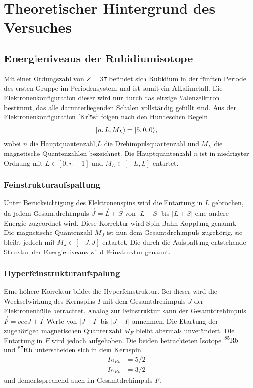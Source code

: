 \section{Theoretischer Hintergrund des Versuches}
\label{sec:Theorie}
\subsection{Energieniveaus der Rubidiumisotope}
Mit einer Ordungszahl von $Z=\num{37}$ befindet sich Rubidium in der 
fünften Periode des ersten Gruppe im Periodensystem und ist somit ein
Alkalimetall. Die Elektronenkonfiguration dieser wird nur durch 
das einzige Valenzelktron bestimmt, das alle darunterliegenden Schalen
vollständig gefüllt sind. Aus der Elektronenkonfiguration 
$\text{[Kr]}5\text{s}^1$ folgen nach den Hundeschen Regeln
\begin{equation*}
    \lvert {n,L,M_L} \rangle=\lvert {5,0,0} \rangle,
\end{equation*}
wobei $n$ die Hauptquantenzahl,$L$ die Drehimpulsquantenzahl
und $M_L$ die magnetische Quantenzahlen bezeichnet. Die 
Hauptquantenzahl $n$ ist in niedrigster Ordnung mit $L\in [0,n-1]$ und 
$M_L\in[-L,L]$ entartet. 

\subsubsection{Feinstrukturaufspaltung}
Unter Berücksichtigung des Elektronenspins
wird die Entartung in $L$ gebrochen, da jedem Gesamtdrehimpuls 
$\vec{J}=\vec{L}+\vec{S}$ von 
$|L-S|$ bis $|L+S|$ eine andere Energie zugeordnet wird. Diese 
Korrektur wird Spin-Bahn-Kopplung genannt. Die magnetische Quantenzahl
$M_J$ ist nun dem Gesamtdrehimpuls zugehörig, sie bleibt jedoch mit 
$M_J\in[-J,J]$ entartet. Die durch die Aufspaltung entstehende Struktur
der Energieniveaus wird Feinstruktur genannt. 

\subsubsection{Hyperfeinstrukturaufspalung}
Eine höhere Korrektur bildet die Hyperfeinstruktur. Bei dieser wird 
die Wechselwirkung des Kernspins $I$ mit dem Gesamtdrehimpuls $J$ der
Elektronenhülle betrachtet. Analog zur Feinstruktur kann der Gesamtdrehimpuls
$\vec{F}=vec{J}+\vec{I}$ Werte von $|J-I|$ bis $|J+I|$ annehmen. 
Die Etartung der zugehörigen magnetischen Quantenzahl $M_F$ bleibt
abermals unverändert. Die Entartung in $F$ wird jedoch aufgehoben. 
Die beiden betrachteten Isotope $\ce{^{85}Rb}$ und $\ce{^{87}Rb}$
unterscheiden sich in dem Kernspin
\begin{align*}
    I_{^{85}Rb}&=5/2\\
    I_{^{87}Rb}&=3/2
\end{align*}
und dementsprechend auch im Gesamtdrehimpuls $F$.

